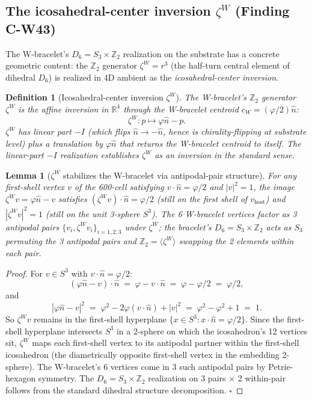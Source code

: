 \documentclass[11pt,letterpaper]{article}
\newtheorem{lemma}[theorem]{Lemma}
\newtheorem{definition}[theorem]{Definition}
\newcommand{\phig}{\varphi}
\newcommand{\Dsix}{D_6}
\newcommand{\Sthree}{S_3}
\begin{document}
\subsection{The icosahedral-center inversion $\zeta^W$ (Finding C-W43)}\label{sec:w_zeta_inversion}

The W-bracelet's $\Dsix = \Sthree \times \mathbb{Z}_2$ realization on the substrate has a concrete geometric content: the $\mathbb{Z}_2$ generator $\zeta^W = r^3$ (the half-turn central element of dihedral $\Dsix$) is realized in 4D ambient as the \emph{icosahedral-center inversion}.

\begin{definition}[Icosahedral-center inversion $\zeta^W$]\label{def:zeta_w}
The W-bracelet's $\mathbb{Z}_2$ generator $\zeta^W$ is the affine inversion in $\mathbb{R}^4$ through the W-bracelet centroid $c_W = (\phig/2)\hat{n}$:
\begin{equation}\label{eq:w_zeta_definition}
\zeta^W : p \mapsto \phig\hat{n} - p.
\end{equation}
$\zeta^W$ has linear part $-I$ (which flips $\hat{n} \to -\hat{n}$, hence is chirality-flipping at substrate level) plus a translation by $\phig\hat{n}$ that returns the W-bracelet centroid to itself. The linear-part $-I$ realization establishes $\zeta^W$ as an inversion in the standard sense.
\end{definition}

\begin{lemma}[$\zeta^W$ stabilizes the W-bracelet via antipodal-pair structure]\label{lem:zeta_w_antipodal}
For any first-shell vertex $v$ of the 600-cell satisfying $v \cdot \hat{n} = \phig/2$ and $|v|^2 = 1$, the image $\zeta^W v = \phig\hat{n} - v$ satisfies $(\zeta^W v) \cdot \hat{n} = \phig/2$ (still on the first shell of $v_{\text{host}}$) and $|\zeta^W v|^2 = 1$ (still on the unit 3-sphere $S^3$). The 6 W-bracelet vertices factor as 3 antipodal pairs $\{v_i, \zeta^W v_i\}_{i=1,2,3}$ under $\zeta^W$; the bracelet's $\Dsix = \Sthree \times \mathbb{Z}_2$ acts as $\Sthree$ permuting the 3 antipodal pairs and $\mathbb{Z}_2 = \langle \zeta^W \rangle$ swapping the 2 elements within each pair.
\end{lemma}

\begin{proof}
For $v \in S^3$ with $v \cdot \hat{n} = \phig/2$: 
\[
(\phig\hat{n} - v) \cdot \hat{n} \;=\; \phig - v \cdot \hat{n} \;=\; \phig - \phig/2 \;=\; \phig/2,
\]
and 
\[
|\phig\hat{n} - v|^2 \;=\; \phig^2 - 2\phig(v \cdot \hat{n}) + |v|^2 \;=\; \phig^2 - \phig^2 + 1 \;=\; 1.
\]
So $\zeta^W v$ remains in the first-shell hyperplane $\{x \in S^3 : x \cdot \hat{n} = \phig/2\}$. Since the first-shell hyperplane intersects $S^3$ in a 2-sphere on which the icosahedron's 12 vertices sit, $\zeta^W$ maps each first-shell vertex to its antipodal partner within the first-shell icosahedron (the diametrically opposite first-shell vertex in the embedding 2-sphere). The W-bracelet's 6 vertices come in 3 such antipodal pairs by Petrie-hexagon symmetry. The $\Dsix = \Sthree \times \mathbb{Z}_2$ realization on 3 pairs $\times$ 2 within-pair follows from the standard dihedral structure decomposition. $\square$
\end{proof}
\end{document}
